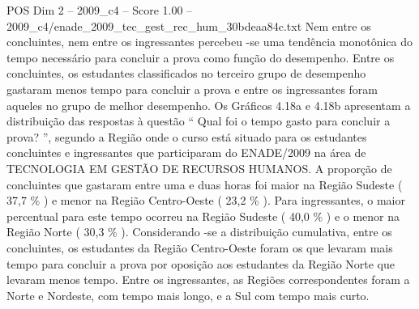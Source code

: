 \begin{textsample}{POS Dim 2 – 2009\_c4 – Score 1.00 – 2009\_c4/enade\_2009\_tec\_gest\_rec\_hum\_30bdeaa84c.txt}
Nem entre os concluintes, nem entre os ingressantes percebeu -se uma tendência monotônica do tempo necessário para concluir a prova como função do desempenho.
Entre os concluintes, os estudantes classificados no terceiro grupo de desempenho gastaram menos tempo para concluir a prova e entre os ingressantes foram aqueles no grupo de melhor desempenho.
Os Gráficos 4.18a e 4.18b apresentam a distribuição das respostas à questão “ Qual foi o tempo gasto para concluir a prova? ”, segundo a Região onde o curso está situado para os estudantes concluintes e ingressantes que participaram do ENADE/2009 na área de TECNOLOGIA EM GESTÃO DE RECURSOS HUMANOS.
A proporção de concluintes que gastaram entre uma e duas horas foi maior na Região Sudeste ( 37,7 \% ) e menor na Região Centro-Oeste ( 23,2 \% ).
Para ingressantes, o maior percentual para este tempo ocorreu na Região Sudeste ( 40,0 \% ) e o menor na Região Norte ( 30,3 \% ).
Considerando -se a distribuição cumulativa, entre os concluintes, os estudantes da Região Centro-Oeste foram os que levaram mais tempo para concluir a prova por oposição aos estudantes da Região Norte que levaram menos tempo.
Entre os ingressantes, as Regiões correspondentes foram a Norte e Nordeste, com tempo mais longo, e a Sul com tempo mais curto.

\end{textsample}
